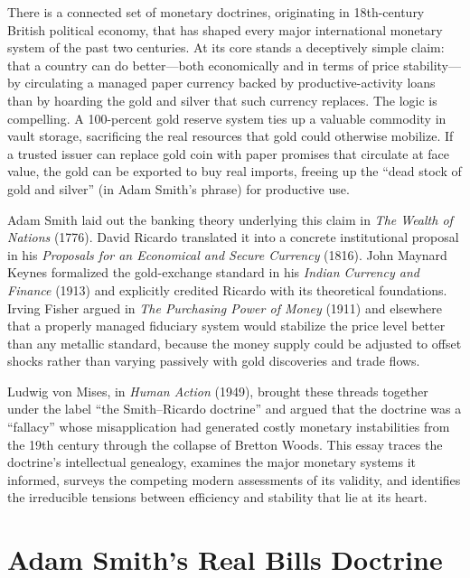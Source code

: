 \documentclass[12pt]{article}
\begin{document}
There is a connected set of monetary doctrines, originating in
18th-century British political economy, that has shaped every major
international monetary system of the past two centuries.  At its core
stands a deceptively simple claim: that a country can do better---both
economically and in terms of price stability---by circulating a managed
paper currency backed by productive-activity loans than by hoarding the
gold and silver that such currency replaces.  The logic is compelling.
A 100-percent gold reserve system ties up a valuable commodity in
vault storage, sacrificing the real resources that gold could otherwise
mobilize.  If a trusted issuer can replace gold coin with paper
promises that circulate at face value, the gold can be exported to buy
real imports, freeing up the ``dead stock of gold and silver'' (in
Adam Smith's phrase) for productive use.

Adam Smith laid out the banking theory underlying this claim in
\textit{The Wealth of Nations} (1776).  David Ricardo translated it
into a concrete institutional proposal in his \textit{Proposals for an
Economical and Secure Currency} (1816).  John Maynard Keynes formalized
the gold-exchange standard in his \textit{Indian Currency and Finance}
(1913) and explicitly credited Ricardo with its theoretical foundations.
Irving Fisher argued in \textit{The Purchasing Power of Money} (1911)
and elsewhere that a properly managed fiduciary system would stabilize
the price level better than any metallic standard, because the money
supply could be adjusted to offset shocks rather than varying
passively with gold discoveries and trade flows.

Ludwig von Mises, in \textit{Human Action} (1949), brought these
threads together under the label ``the Smith--Ricardo doctrine'' and
argued that the doctrine was a ``fallacy'' whose misapplication had
generated costly monetary instabilities from the 19th century through
the collapse of Bretton Woods.  This essay traces the doctrine's
intellectual genealogy, examines the major monetary systems it
informed, surveys the competing modern assessments of its validity,
and identifies the irreducible tensions between efficiency and
stability that lie at its heart.

\section{Adam Smith's Real Bills Doctrine}
\label{sec:smith}
\end{document}
